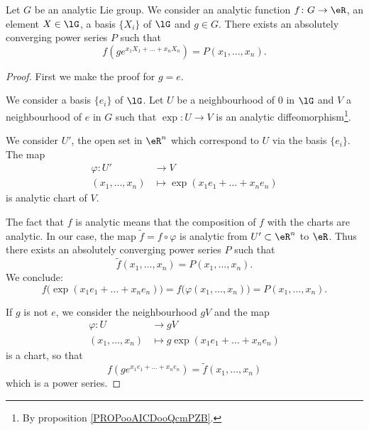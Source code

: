 \begin{lemma}     \label{LEMooPILVooHQbtAH}
    Let \( G\) be an analytic Lie group. We consider an analytic function \( f\colon G\to \eR\), an element \( X\in \lG\), a basis \( \{ X_i \}\) of \( \lG\) and \( g\in G\). There exists an absolutely converging power series \( P\) such that
    \begin{equation}
        f(g e^{x_1X_1+\ldots +x_nX_n})=P(x_1,\ldots, x_n).
    \end{equation}
\end{lemma}

\begin{proof}
    First we make the proof for \( g=e\).

    We consider a basis \( \{ e_i \}\) of \( \lG\). Let \( U\) be a neighbourhood of \( 0\) in \( \lG\) and \( V\) a neighbourhood of \( e\) in \( G\) such that \( \exp\colon U\to V\) is an analytic diffeomorphism\footnote{By proposition \ref{PROPooAICDooQcmPZB}.}.

    We consider \( U'\), the open set in \( \eR^n\) which correspond to \( U\) via the basis \( \{ e_i \}\). The map
    \begin{equation}
        \begin{aligned}
            \varphi\colon U'&\to V \\
            (x_1,\ldots, x_n)&\mapsto \exp(x_1e_1+\ldots+x_ne_n)
        \end{aligned}
    \end{equation}
    is analytic chart of \( V\).

    The fact that \( f\) is analytic means that the composition of \( f\) with the charts are analytic. In our case, the map \( \tilde f =f\circ\varphi\) is analytic from \( U'\subset \eR^n\) to \( \eR\). Thus there exists an absolutely converging power series \( P\) such that
    \begin{equation}
        \tilde f(x_1,\ldots, x_n)=P(x_1,\ldots, x_n).
    \end{equation}
    We conclude:
    \begin{equation}
        f\big( \exp(x_1e_1+\ldots +x_ne_n) \big)=f\big( \varphi(x_1,\ldots, x_n) \big)=P(x_1,\ldots, x_n).
    \end{equation}
    
    If \( g\) is not \( e\), we consider the neighbourhood \( gV\) and the map
    \begin{equation}
        \begin{aligned}
            \varphi\colon U&\to gV \\
            (x_1,\ldots, x_n)&\mapsto g\exp(x_1e_1+\ldots +x_ne_n)
        \end{aligned}
    \end{equation}
    is a chart, so that
    \begin{equation}
        f(g e^{x_1e_1+\ldots +x_ne_n})=\tilde f(x_1,\ldots, x_n)
    \end{equation}
    which is a power series.
\end{proof}

